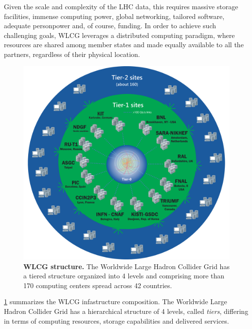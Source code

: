 Given the scale and complexity of the LHC data, this requires massive storage facilities, immense computing power, global networking, tailored software, adequate personpower and, of course, funding.
In order to achieve such challenging goals, WLCG leverages a distributed computing paradigm, where resources are shared among member states and made equally available to all the partners, regardless of their physical location.
\begin{figure}
    \centering
    \includegraphics[width=\textwidth]{figures/220_introduction/WLCG-Tiers-2021_v3.png}
    \caption{\textbf{WLCG structure.} The Worldwide Large Hadron Collider Grid has a tiered structure organized into 4 levels and comprising more than 170 computing centers spread across 42 countries.
    } \label{fig:wlcg}
\end{figure}
\cref{fig:wlcg} summarizes the WLCG infastructure composition. 
The Worldwide Large Hadron Collider Grid has a hierarchical structure of 4 levels, called \textit{tiers}, differing in terms of computing resources, storage capabilities and delivered services. 
